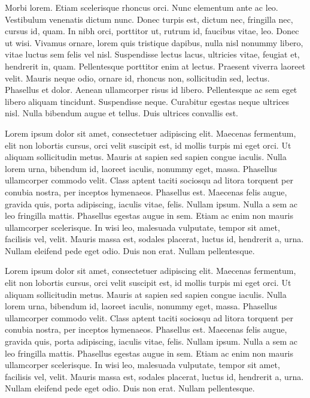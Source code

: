 \documentclass{article}
\begin{document}
Morbi lorem. Etiam scelerisque rhoncus orci. Nunc elementum ante ac leo. Vestibulum venenatis dictum nunc. Donec turpis est, dictum nec, fringilla nec, cursus id, quam. In nibh orci, porttitor ut, rutrum id, faucibus vitae, leo. Donec ut wisi. Vivamus ornare, lorem quis tristique dapibus, nulla nisl nonummy libero, vitae luctus sem felis vel nisl. Suspendisse lectus lacus, ultricies vitae, feugiat et, hendrerit in, quam. Pellentesque porttitor enim at lectus. Praesent viverra laoreet velit. Mauris neque odio, ornare id, rhoncus non, sollicitudin sed, lectus. Phasellus et dolor. Aenean ullamcorper risus id libero. Pellentesque ac sem eget libero aliquam tincidunt. Suspendisse neque. Curabitur egestas neque ultrices nisl. Nulla bibendum augue et tellus. Duis ultrices convallis est.

Lorem ipsum dolor sit amet, consectetuer adipiscing elit. Maecenas fermentum, elit non lobortis cursus, orci velit suscipit est, id mollis turpis mi eget orci. Ut aliquam sollicitudin metus. Mauris at sapien sed sapien congue iaculis. Nulla lorem urna, bibendum id, laoreet iaculis, nonummy eget, massa. Phasellus ullamcorper commodo velit. Class aptent taciti sociosqu ad litora torquent per conubia nostra, per inceptos hymenaeos. Phasellus est. Maecenas felis augue, gravida quis, porta adipiscing, iaculis vitae, felis. Nullam ipsum. Nulla a sem ac leo fringilla mattis. Phasellus egestas augue in sem. Etiam ac enim non mauris ullamcorper scelerisque. In wisi leo, malesuada vulputate, tempor sit amet, facilisis vel, velit. Mauris massa est, sodales placerat, luctus id, hendrerit a, urna. Nullam eleifend pede eget odio. Duis non erat. Nullam pellentesque.

Lorem ipsum dolor sit amet, consectetuer adipiscing elit. Maecenas fermentum, elit non lobortis cursus, orci velit suscipit est, id mollis turpis mi eget orci. Ut aliquam sollicitudin metus. Mauris at sapien sed sapien congue iaculis. Nulla lorem urna, bibendum id, laoreet iaculis, nonummy eget, massa. Phasellus ullamcorper commodo velit. Class aptent taciti sociosqu ad litora torquent per conubia nostra, per inceptos hymenaeos. Phasellus est. Maecenas felis augue, gravida quis, porta adipiscing, iaculis vitae, felis. Nullam ipsum. Nulla a sem ac leo fringilla mattis. Phasellus egestas augue in sem. Etiam ac enim non mauris ullamcorper scelerisque. In wisi leo, malesuada vulputate, tempor sit amet, facilisis vel, velit. Mauris massa est, sodales placerat, luctus id, hendrerit a, urna. Nullam eleifend pede eget odio. Duis non erat. Nullam pellentesque.
\end{document}
